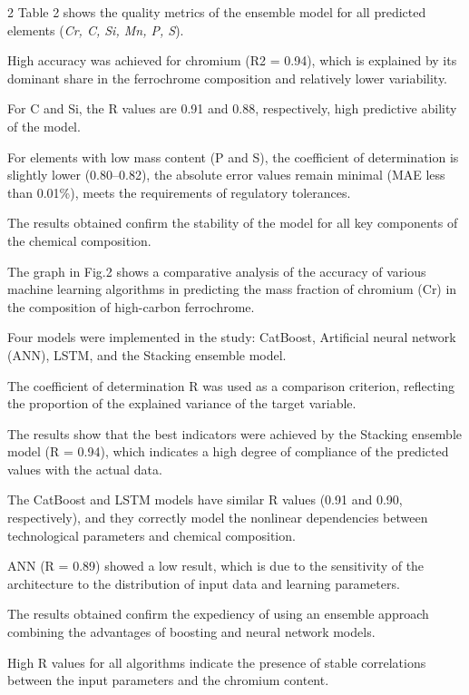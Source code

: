 \begin{multicols}{2}
Table 2 shows the quality metrics of the ensemble model for all
predicted elements (\emph{Cr, C, Si, Mn, P, S}).

High accuracy was achieved for chromium (R2 = 0.94), which is explained
by its dominant share in the ferrochrome composition and relatively
lower variability.

For C and Si, the R values are 0.91 and 0.88,
respectively, high predictive ability of the model.

For elements with low mass content (P and S), the coefficient of
determination is slightly lower (0.80--0.82), the absolute error values
remain minimal (MAE less than 0.01\%), meets the requirements of
regulatory tolerances.

The results obtained confirm the stability of the model for all key
components of the chemical composition.

The graph in Fig.2 shows a comparative analysis of the accuracy of
various machine learning algorithms in predicting the mass fraction of
chromium (Cr) in the composition of high-carbon ferrochrome.

Four models were implemented in the study: CatBoost, Artificial neural
network (ANN), LSTM, and the Stacking ensemble model.

The coefficient of determination R was used as a
comparison criterion, reflecting the proportion of the explained
variance of the target variable.

The results show that the best indicators were achieved by the Stacking
ensemble model (R = 0.94), which indicates a high
degree of compliance of the predicted values with the actual data.

The CatBoost and LSTM models have similar R values
(0.91 and 0.90, respectively), and they correctly model the nonlinear
dependencies between technological parameters and chemical composition.

ANN (R = 0.89) showed a low result, which is due to
the sensitivity of the architecture to the distribution of input data
and learning parameters.

The results obtained confirm the expediency of using an ensemble
approach combining the advantages of boosting and neural network models.

High R values for all algorithms indicate the
presence of stable correlations between the input parameters and the
chromium content.
\end{multicols}

